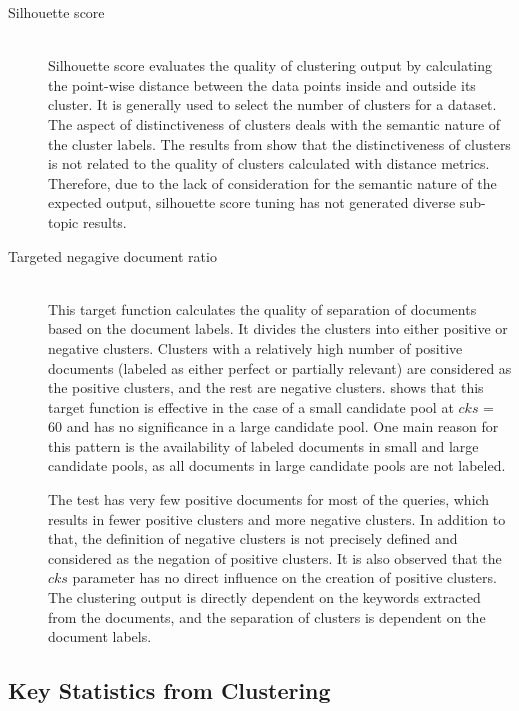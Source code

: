  \begin{description}
 	\item[Silhouette score]  \hfill \\ 
Silhouette score evaluates the quality of clustering output by calculating the point-wise distance between the data points inside and outside its cluster. It is generally used to select the number of clusters for a dataset. The aspect of distinctiveness of clusters deals with the semantic nature of the cluster labels. The results from  show that the distinctiveness of clusters is not related to the quality of clusters calculated with distance metrics. Therefore, due to the lack of consideration for the semantic nature of the expected output, silhouette score tuning has not generated diverse sub-topic results.
 	
 	\item[Targeted negagive document ratio]  \hfill \\ 
This target function calculates the quality of separation of documents based on the document labels. It divides the clusters into either positive or negative clusters. Clusters with a relatively high number of positive documents (labeled as either perfect or partially relevant) are considered as the positive clusters, and the rest are negative clusters.  shows that this target function is effective in the case of a small candidate pool at $cks$ = 60 and has no significance in a large candidate pool. One main reason for this pattern is the availability of labeled documents in small and large candidate pools, as all documents in large candidate pools are not labeled.
 	
 The test has very few positive documents for most of the queries, which results in fewer positive clusters and more negative clusters. In addition to that, the definition of negative clusters is not precisely defined and considered as the negation of positive clusters. It is also observed that the $cks$ parameter has no direct influence on the creation of positive clusters. The clustering output is directly dependent on the keywords extracted from the documents, and the separation of clusters is dependent on the document labels.
 	
 	
 	
 \end{description}
 
 	
\subsection{Key Statistics from Clustering}

